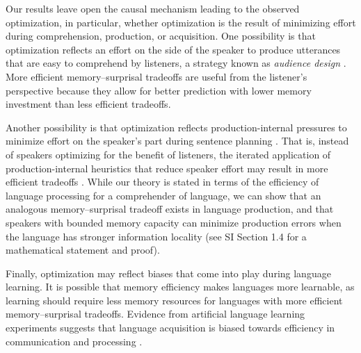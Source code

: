 
Our results leave open the causal mechanism leading to the observed optimization, in particular, whether optimization is the result of minimizing effort during comprehension, production, or acquisition. One possibility is that optimization reflects an effort on the side of the speaker to produce utterances that are easy to comprehend by listeners, a strategy known as \emph{audience design} \citep{clark1982audience,lindblom1990communication, brennan1995feeling}. More efficient memory--surprisal tradeoffs are useful from the listener's perspective because they allow for better prediction with lower memory investment than less efficient tradeoffs. 

Another possibility is that optimization reflects production-internal pressures to minimize effort on the speaker's part during sentence planning \citep{bock1985conceptual,ferreira2000effect,macdonald2013language,fedzechkina2020production}. That is, instead of speakers optimizing for the benefit of listeners, the iterated application of production-internal heuristics that reduce speaker effort may result in more efficient tradeoffs \citep{macdonald2013language}. %
While our theory is stated in terms of the efficiency of language processing for a comprehender of language, we can show that an analogous memory--surprisal tradeoff exists in language production, and that speakers with bounded memory capacity can minimize production errors when the language has stronger information locality (see SI Section 1.4 for a mathematical statement and proof).


Finally, optimization may reflect biases that come into play during language learning.
It is possible that memory efficiency makes languages more learnable, as learning should require less memory resources for languages with more efficient memory--surprisal tradeoffs.
Evidence from artificial language learning experiments suggests that language acquisition is biased towards efficiency in communication and processing \citep[e.g.][]{fedzechkina2012language, fedzechkina-human-2017}.

